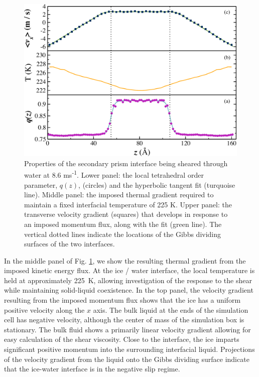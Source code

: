 \documentclass[journal = jpccck, manuscript = article]{achemso}
\begin{document}
\begin{figure}
\includegraphics[width=\linewidth]{Sec_comic_strip}
\caption{\label{fig:spComic} Properties of the secondary prism
  interface being sheared through water at 8.6
  ms\textsuperscript{-1}. Lower panel: the local tetrahedral order
  parameter, $q(z)$, (circles) and the hyperbolic tangent fit
  (turquoise line).  Middle panel: the imposed thermal gradient
  required to maintain a fixed interfacial temperature of 225 K. Upper
  panel: the transverse velocity gradient (squares) that develops in
  response to an imposed momentum flux, along with the fit (green
  line). The vertical dotted lines indicate the locations of the Gibbs
  dividing surfaces of the two interfaces.}
\end{figure}

In the middle panel of Fig. \ref{fig:spComic}, we show the resulting
thermal gradient from the imposed kinetic energy flux. At the ice /
water interface, the local temperature is held at approximately 225~K, allowing
investigation of the response to the shear while maintaining
solid-liquid coexistence. In the top panel, the velocity gradient
resulting from the imposed momentum flux shows that the ice has a
uniform positive velocity along the $x$ axis. The bulk liquid at the
ends of the simulation cell has negative velocity, although the center
of mass of the simulation box is stationary.  The bulk fluid shows a
primarily linear velocity gradient allowing for easy calculation of
the shear viscosity. Close to the interface, the ice imparts
significant positive momentum into the surrounding interfacial liquid.
Projections of the velocity gradient from the liquid onto the Gibbs
dividing surface indicate that the ice-water interface is in the
negative slip regime.
\end{document}
